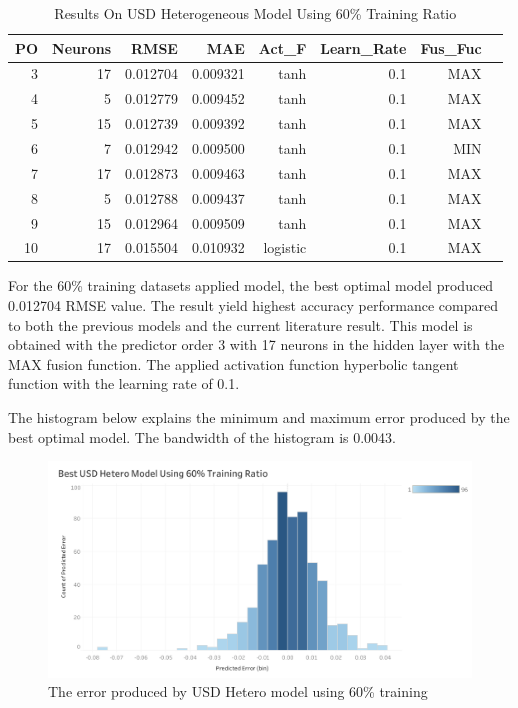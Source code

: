 {{{{{{		\setlength{\tabcolsep}{0.5em} %
		{\renewcommand{\arraystretch}{1.2}
			
			\begin{table}[ht]
				\centering
				\begin{tabular}{@{}rrrrrrrr@{}}
					\toprule
					\textbf{PO}&\textbf{Neurons}& \textbf{RMSE} & \textbf{MAE} & \textbf{Act\_F}  & \textbf{Learn\_Rate} &\textbf{ Fus\_Fuc}\\ 
					\midrule
					3 & 17 & 0.012704 & 0.009321 & tanh & 0.1 & MAX \\ 
					4 & 5 & 0.012779 & 0.009452 & tanh & 0.1 & MAX \\ 
					5 & 15 & 0.012739 & 0.009392 & tanh & 0.1 & MAX \\ 
					6 & 7 & 0.012942 & 0.009500 & tanh & 0.1 & MIN \\ 
					7 & 17 & 0.012873 & 0.009463 & tanh & 0.1 & MAX \\ 
					8 & 5 & 0.012788 & 0.009437 & tanh & 0.1 & MAX \\ 
					9 & 15 & 0.012964 & 0.009509 & tanh & 0.1 & MAX \\ 
					10 & 17 & 0.015504 & 0.010932 & logistic & 0.1 & MAX \\ 
					\hline
				\end{tabular}
				\hspace*{1cm}
				\caption{Results On USD Heterogeneous Model Using 60\% Training Ratio}
			\end{table}
			
			For the 60\% training datasets applied model, the best optimal model produced 0.012704 RMSE value. The result yield highest  accuracy performance  compared to both the previous models and the current literature result. This model is obtained with the predictor order 3 with 17 neurons in the hidden layer with the MAX fusion function. The applied activation function hyperbolic tangent function with the learning rate of 0.1.
			
			The histogram below explains the minimum and maximum error produced by the best optimal model. The bandwidth of the histogram is 0.0043.
			
			\begin{figure}[hbt!]\centering
				\includegraphics[width=1\textwidth]{hetero_usd_60}
				\caption{The error produced by USD Hetero model using 60\% training}
			\end{figure}
			\pagebreak
			
}}}}}}}
